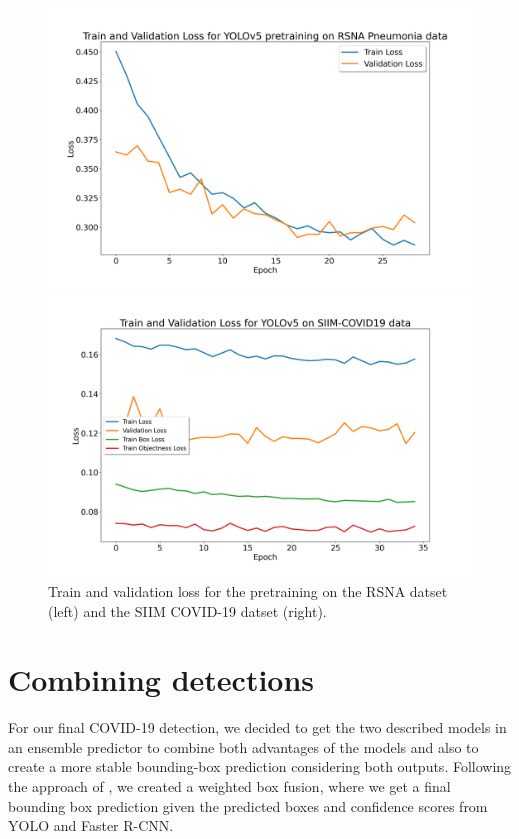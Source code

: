\begin{figure}[h!]
	\centering
	\begin{minipage}{.5\textwidth}
		\centering
		\includegraphics[width=\linewidth]{img/loss_yolo_30.png}
	\end{minipage}%
	\begin{minipage}{0.5\textwidth}
		\centering
		\includegraphics[width=\linewidth]{img/loss_yolo_35_siim_final.png}
	\end{minipage}
\caption{Train and validation loss for the pretraining on the RSNA datset (left) and the SIIM COVID-19 datset (right).}
\label{fig:yolo_losses}
\end{figure}


\section{Combining detections}\label{section:combining_detections}
For our final COVID-19 detection, we decided to get the two described models in an ensemble predictor to combine both advantages of the models and also to create a more stable bounding-box prediction considering both outputs. Following the approach of \citeauthor{weightedBoxFusion} \autocite{weightedBoxFusion}, we created a weighted box fusion, where we get a final bounding box prediction given the predicted boxes and confidence scores from \ac{YOLO} and Faster \ac{R-CNN}.

